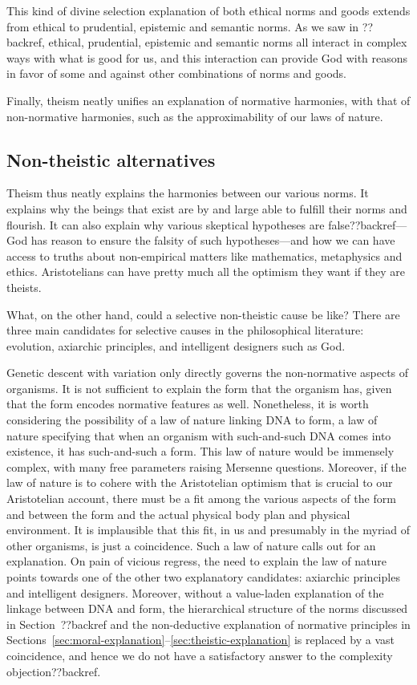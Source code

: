 This kind of divine selection explanation of both ethical norms and goods extends from ethical to prudential, epistemic and 
semantic norms. As we saw in ??backref, ethical, prudential, epistemic and semantic norms all interact in complex ways with 
what is good for us, and this interaction can provide God with reasons in favor of some and against other combinations of
norms and goods.

Finally, theism neatly unifies an explanation of normative harmonies, with that of non-normative harmonies,
such as the approximability of our laws of nature.

\subsection{Non-theistic alternatives}
Theism thus neatly explains the harmonies between our various norms. It explains why the beings that exist are
by and large able to fulfill their norms and flourish. It can also explain why various skeptical hypotheses are
false??backref---God has reason to ensure the falsity of such hypotheses---and how we can have access to truths about
non-empirical matters like mathematics, metaphysics and ethics. Aristotelians can have pretty much all the optimism
they want if they are theists.

What, on the other hand, could a selective non-theistic cause be like? There are three main candidates for selective causes in the philosophical literature: evolution, axiarchic principles, and intelligent designers such as God.  

Genetic descent with variation only directly governs the non-normative aspects of organisms. It is not sufficient to explain
the form that the organism has, given that the form encodes normative features as well. Nonetheless, it is worth considering
the possibility of a law of nature linking DNA to form, a law of nature specifying that when an organism with such-and-such 
DNA comes into existence, it has such-and-such a form. This law of nature would be immensely complex, with many free parameters
raising Mersenne questions. Moreover, if the law of nature is to cohere with the Aristotelian optimism that is crucial to our
Aristotelian account, there must be a fit among the various aspects of the form and between the form and the actual physical 
body plan and physical environment. It is implausible that this fit, in us and presumably in the myriad of other organisms,
is just a coincidence. Such a law of nature calls out for an explanation. On pain of vicious regress, the need to explain the 
law of nature points towards one of the other two explanatory candidates: axiarchic principles and intelligent designers.
Moreover, without a value-laden explanation of the linkage between DNA and form, the hierarchical structure of the
norms discussed in Section~??backref and the non-deductive explanation of normative principles in Sections~\ref{sec:moral-explanation}--\ref{sec:theistic-explanation} is replaced by a vast coincidence, and hence we do not have a 
satisfactory answer to the complexity objection??backref.

